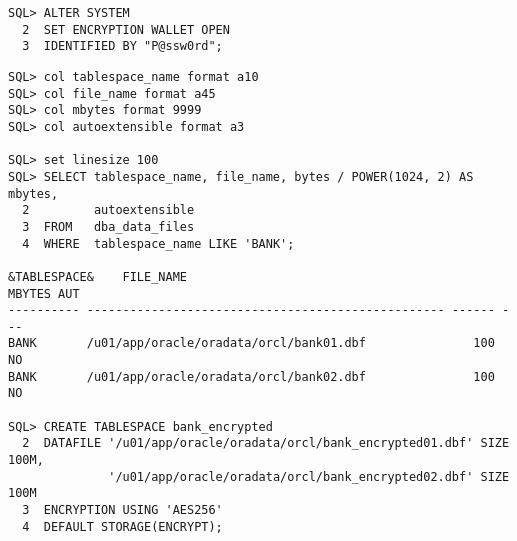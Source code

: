 \begin{enumerate}
\begin{lstlisting}[language=oracle_sql]
SQL> ALTER SYSTEM
  2  SET ENCRYPTION WALLET OPEN
  3  IDENTIFIED BY "P@ssw0rd";
    \end{lstlisting}
    \begin{lstlisting}[language=oracle_sql,alsolanguage=sqlplus]
SQL> col tablespace_name format a10
SQL> col file_name format a45
SQL> col mbytes format 9999
SQL> col autoextensible format a3

SQL> set linesize 100
SQL> SELECT tablespace_name, file_name, bytes / POWER(1024, 2) AS mbytes,
  2         autoextensible
  3  FROM   dba_data_files
  4  WHERE  tablespace_name LIKE 'BANK';

&TABLESPACE&    FILE_NAME                                         MBYTES AUT
---------- -------------------------------------------------- ------ ---
BANK       /u01/app/oracle/oradata/orcl/bank01.dbf               100 NO
BANK       /u01/app/oracle/oradata/orcl/bank02.dbf               100 NO

SQL> CREATE TABLESPACE bank_encrypted
  2  DATAFILE '/u01/app/oracle/oradata/orcl/bank_encrypted01.dbf' SIZE 100M,
              '/u01/app/oracle/oradata/orcl/bank_encrypted02.dbf' SIZE 100M
  3  ENCRYPTION USING 'AES256'
  4  DEFAULT STORAGE(ENCRYPT);
    \end{lstlisting}
\end{enumerate}
\clearpage